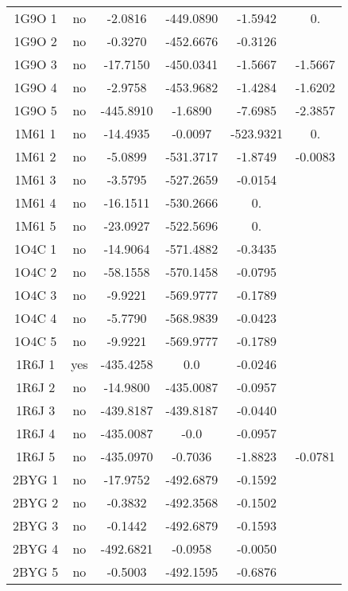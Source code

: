 \begin{table}[h]
\begin{tabular}{cccccc}
        1G9O 1 & no & -2.0816    &    -449.0890 & -1.5942 & 0. \\               
        1G9O 2 & no & -0.3270    &    -452.6676 & -0.3126 & \\          
        1G9O 3 & no & -17.7150   &    -450.0341 & -1.5667 & -1.5667 \\         
        1G9O 4 & no & -2.9758    &    -453.9682 & -1.4284 & -1.6202 \\          
        1G9O 5 & no & -445.8910  &    -1.6890 & -7.6985 & -2.3857 \\          
        1M61 1 & no & -14.4935   &    -0.0097 & -523.9321 & 0. \\            
        1M61 2 & no & -5.0899    &    -531.3717 & -1.8749 & -0.0083 \\         
        1M61 3 & no & -3.5795    &    -527.2659 & -0.0154 & \\           
        1M61 4 & no & -16.1511   &    -530.2666 & 0. & \\              
        1M61 5 & no & -23.0927   &    -522.5696 & 0. & \\                 
        1O4C 1 & no & -14.9064   &    -571.4882 & -0.3435 & \\         
        1O4C 2 & no & -58.1558   &    -570.1458 & -0.0795 & \\         
        1O4C 3 & no & -9.9221    &    -569.9777 & -0.1789 & \\          
        1O4C 4 & no & -5.7790    &    -568.9839 & -0.0423 & \\          
        1O4C 5 & no & -9.9221    &    -569.9777 & -0.1789 & \\          
        1R6J 1 & yes& -435.4258  &     0.0 & -0.0246 & \\               
        1R6J 2 & no & -14.9800   &    -435.0087 & -0.0957 & \\         
        1R6J 3 & no & -439.8187  &    -439.8187 & -0.0440 & \\               
        1R6J 4 & no &  -435.0087  &    -0.0 & -0.0957 & \\               
        1R6J 5 & no & -435.0970  &    -0.7036 & -1.8823 & -0.0781 \\          
        2BYG 1 & no & -17.9752   &    -492.6879 & -0.1592 & \\         
        2BYG 2 & no & -0.3832    &    -492.3568 & -0.1502 & \\          
        2BYG 3 & no & -0.1442    &    -492.6879 & -0.1593 & \\          
        2BYG 4 & no & -492.6821 &    -0.0958 & -0.0050 & \\          
        2BYG 5 & no & -0.5003    &   -492.1595 & -0.6876 & \\           
       \bottomrule


 \end{tabular}      
\label{tab:result_echec_30}      
\end{table}
 
